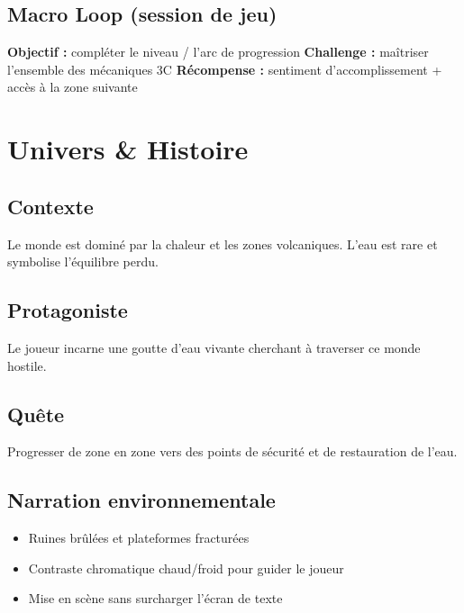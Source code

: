 ﻿\documentclass[12pt,a4paper]{article}
\begin{document}
\subsection{Macro Loop (session de jeu)}
\begin{tcolorbox}[colback=lightgray,colframe=black]
\textbf{Objectif :} compléter le niveau / l'arc de progression\newline
\textbf{Challenge :} maîtriser l'ensemble des mécaniques 3C\newline
\textbf{Récompense :} sentiment d'accomplissement + accès à la zone suivante
\end{tcolorbox}

\section{Univers \& Histoire}

\subsection{Contexte}
Le monde est dominé par la chaleur et les zones volcaniques. L'eau est rare et symbolise l'équilibre perdu.

\subsection{Protagoniste}
Le joueur incarne une goutte d'eau vivante cherchant à traverser ce monde hostile.

\subsection{Quête}
Progresser de zone en zone vers des points de sécurité et de restauration de l'eau.

\subsection{Narration environnementale}
\begin{itemize}[noitemsep]
    \item Ruines brûlées et plateformes fracturées
    \item Contraste chromatique chaud/froid pour guider le joueur
    \item Mise en scène sans surcharger l'écran de texte
\end{itemize}

\end{document}
